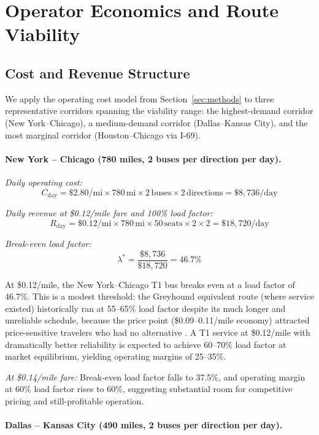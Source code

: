 \section{Operator Economics and Route Viability}
\label{sec:economics}

\subsection{Cost and Revenue Structure}

We apply the operating cost model from Section~\ref{sec:methods} to three representative corridors spanning the viability range: the highest-demand corridor (New York--Chicago), a medium-demand corridor (Dallas--Kansas City), and the most marginal corridor (Houston--Chicago via I-69).

\paragraph{New York -- Chicago (780 miles, 2 buses per direction per day).}

\emph{Daily operating cost:}
\[
  C_{\text{day}} = \$2.80/\text{mi} \times 780\,\text{mi} \times 2\,\text{buses} \times 2\,\text{directions} = \$8{,}736/\text{day}
\]

\emph{Daily revenue at \$0.12/mile fare and 100\% load factor:}
\[
  R_{\text{day}} = \$0.12/\text{mi} \times 780\,\text{mi} \times 50\,\text{seats} \times 2 \times 2 = \$18{,}720/\text{day}
\]

\emph{Break-even load factor:}
\[
  \lambda^* = \frac{\$8{,}736}{\$18{,}720} = 46.7\%
\]

At \$0.12/mile, the New York--Chicago T1 bus breaks even at a load factor of 46.7\%. This is a modest threshold: the Greyhound equivalent route (where service existed) historically ran at 55--65\% load factor despite its much longer and unreliable schedule, because the price point (\$0.09--0.11/mile economy) attracted price-sensitive travelers who had no alternative \citep{Schwieterman2019}. A T1 service at \$0.12/mile with dramatically better reliability is expected to achieve 60--70\% load factor at market equilibrium, yielding operating margins of 25--35\%.

\emph{At \$0.14/mile fare:} Break-even load factor falls to 37.5\%, and operating margin at 60\% load factor rises to 60\%, suggesting substantial room for competitive pricing and still-profitable operation.

\paragraph{Dallas -- Kansas City (490 miles, 2 buses per direction per day).}


